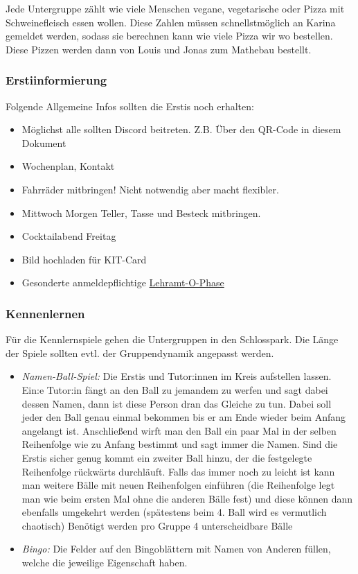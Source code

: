 \documentclass[10pt,ngerman]{scrartcl}
\begin{document}
\begin{multicols}{2}
Jede Untergruppe zählt wie viele Menschen vegane, vegetarische oder Pizza mit
Schweinefleisch essen wollen. Diese Zahlen müssen schnellstmöglich an Karina
gemeldet werden, sodass sie berechnen kann wie viele Pizza wir wo bestellen.
Diese Pizzen werden dann von Louis und Jonas zum Mathebau bestellt.



\subsubsection{Erstiinformierung}

Folgende Allgemeine Infos sollten die Erstis noch erhalten:
\begin{itemize} 
    \item Möglichst alle sollten Discord beitreten. Z.B. Über den QR-Code in
        diesem Dokument
    \item Wochenplan, Kontakt 
    \item Fahrräder mitbringen! Nicht notwendig aber macht flexibler.
    \item Mittwoch Morgen Teller, Tasse und Besteck mitbringen.  
    \item Cocktailabend Freitag 
    \item Bild hochladen für KIT-Card 
    \item Gesonderte anmeldepflichtige \hyperref[lehramt]{Lehramt-O-Phase}
\end{itemize} 

\subsubsection{Kennenlernen}

Für die Kennlernspiele gehen die Untergruppen in den Schlosspark. Die Länge der
Spiele sollten evtl. der Gruppendynamik angepasst werden.  
\begin{itemize}
    \item \emph{Namen-Ball-Spiel:} Die Erstis und Tutor:innen im  Kreis
        aufstellen lassen.  Ein:e Tutor:in fängt an den Ball zu jemandem zu
        werfen und sagt dabei dessen Namen,  dann ist diese Person dran das
        Gleiche zu tun. Dabei soll jeder den Ball genau einmal bekommen bis er
        am Ende wieder beim Anfang angelangt ist. Anschließend wirft man den
        Ball ein paar Mal in der selben Reihenfolge wie zu Anfang bestimmt und
        sagt immer die Namen.  Sind die Erstis sicher genug kommt ein zweiter
        Ball hinzu,  der die festgelegte Reihenfolge rückwärts durchläuft.
        Falls das immer noch zu leicht ist kann man weitere Bälle mit neuen
        Reihenfolgen einführen (die Reihenfolge legt man wie beim ersten Mal
        ohne die anderen Bälle fest) und diese können dann  ebenfalls umgekehrt
        werden (spätestens beim 4.  Ball wird es vermutlich chaotisch) Benötigt
        werden  pro Gruppe 4 unterscheidbare Bälle 
    \item \emph{Bingo:} 
        Die Felder auf den  Bingoblättern mit Namen von
        Anderen füllen, welche die jeweilige Eigenschaft haben.


\end{itemize}
\end{multicols}
\end{document}
